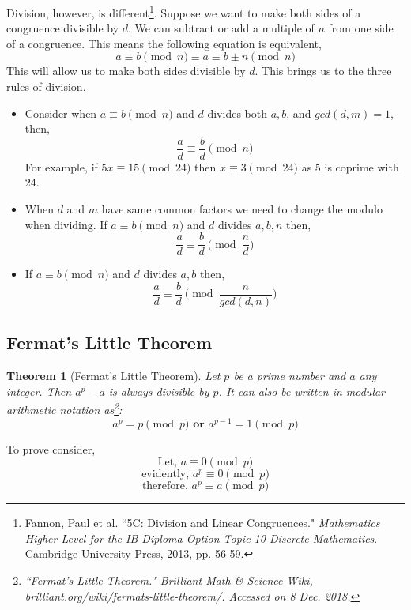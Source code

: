 \documentclass[a4paper,12pt]{article}
\newtheorem{theorem}{Theorem}
\theoremstyle{definition}
\begin{document}
Division, however, is different\footnote{Fannon, Paul et al. ``5C: Division and Linear Congruences." \textit{Mathematics Higher Level for the IB Diploma Option Topic 10 Discrete Mathematics}. Cambridge University Press, 2013, pp. 56-59.}. Suppose we want to make both sides of a congruence divisible by $d$. We can subtract or add a multiple of $n$ from one side of a congruence. This means the following equation is equivalent,
\begin{equation*}
    a \equiv b \pmod n \equiv  a \equiv b \pm n \pmod n
\end{equation*}
\indent This will allow us to make both sides divisible by $d$. This brings us to the three rules of division. 
\begin{itemize}
	\item Consider when $a \equiv b \pmod n$ and $d$ divides both $a,b$, and $gcd(d,m)=1$, then,
\begin{equation*}
	\frac{a}{d} \equiv \frac{b}{d} \pmod n
\end{equation*}
	For example, if $5x \equiv 15 \pmod{24}$ then $x \equiv 3 \pmod{24}$ as 5 is coprime with 24. 
	\item When $d$ and $m$ have same common factors we need to change the modulo when dividing.  If $a \equiv b \pmod n$ and $d$ divides $a,b,n$ then, 
	\begin{equation*}
		\frac{a}{d} \equiv \frac{b}{d} \pmod{\frac{n}{d}}
	\end{equation*}
	\item If $a \equiv b \pmod n$ and $d$ divides $a,b$ then, 
	\begin{equation*}
		\frac{a}{d} \equiv \frac{b}{d} \pmod{\frac{n}{gcd(d,n)}}
	\end{equation*}
\end{itemize}


\subsection{Fermat's Little Theorem}
\begin{theorem}[Fermat's Little Theorem]
	Let $p$ be a prime number and $a$ any integer. Then $a^p -a$ is always divisible by $p$. It can also be written in modular arithmetic notation as\footnote{``Fermat's Little Theorem." \textit{Brilliant Math \& Science Wiki}, brilliant.org/wiki/fermats-little-theorem/. Accessed on 8 Dec. 2018.}:
\begin{equation} \label{littletheorem}
	a^{p} = p \pmod p \textbf{  or } a^{p-1} = 1 \pmod p 
\end{equation}
\end{theorem}
To prove consider, 
\begin{equation*}
\text{Let, }	a \equiv 0 \pmod p
\end{equation*} 
\begin{equation*}
\text{evidently, } a^p \equiv 0 \pmod p	
\end{equation*}
\begin{equation*}
\text{therefore, }	a^p \equiv a \pmod p
\end{equation*}
\end{document}
